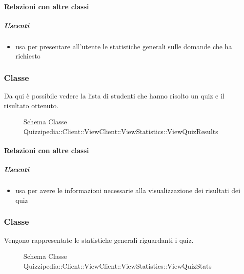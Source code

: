 \paragraph{Relazioni con altre classi}
\subparagraph{Uscenti}
\begin{itemize}
\item usa  per presentare all'utente le statistiche generali sulle domande che ha richiesto
\end{itemize}
\subsubsection{Classe }
Da qui è possibile vedere la lista di studenti che hanno risolto un quiz e il risultato ottenuto.
\begin{figure}[H]
\centering
\noindent{}
\caption[Schema Classe ViewQuizResults]{Schema Classe Quizzipedia::Client::ViewClient::ViewStatistics::ViewQuizResults}
\end{figure}
\paragraph{Relazioni con altre classi}
\subparagraph{Uscenti}
\begin{itemize}
\item usa  per avere le informazioni necessarie alla visualizzazione dei risultati dei quiz
\end{itemize}
\subsubsection{Classe }
Vengono rappresentate le statistiche generali riguardanti i quiz.
\begin{figure}[H]
\centering
\noindent{}
\caption[Schema Classe ViewQuizStats]{Schema Classe Quizzipedia::Client::ViewClient::ViewStatistics::ViewQuizStats}
\end{figure}
